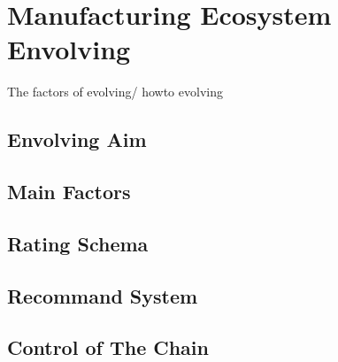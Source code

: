 \section{Manufacturing Ecosystem Envolving} %
\label{sec:envolve}
The factors of evolving/ howto evolving

\subsection{Envolving Aim} %
\label{sub:envolving_aim}

\subsection{Main Factors} %
\label{sub:main_factors}


\subsection{Rating Schema} %
\label{sub:rating_schema}


\subsection{Recommand System} %
\label{sub:recommand_system}


\subsection{Control of The Chain} %
\label{sub:control}

